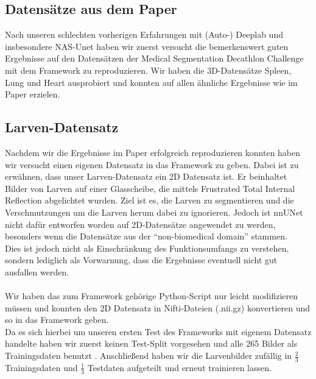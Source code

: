 
\subsection{Datensätze aus dem Paper}
Nach unseren schlechten vorherigen Erfahrungen mit (Auto-) Deeplab \cite{deeplabGithub} und insbesondere NAS-Unet \cite{nasunetGithub} haben wir zuerst versucht die bemerkenswert guten Ergebnisse \parencite[Kapitel 4, Table 2]{nnunetPaper} auf den Datensätzen der Medical Segmentation Decathlon Challenge \cite{msdChallenge} mit dem Framework zu reproduzieren. Wir haben die 3D-Datensätze Spleen, Lung und Heart \cite{msdChallenge} ausprobiert und konnten auf allen ähnliche Ergebnisse wie im Paper erzielen.\\

\subsection{Larven-Datensatz}
Nachdem wir die Ergebnisse im Paper erfolgreich reproduzieren konnten haben wir versucht einen eigenen Datensatz in das Framework zu geben. Dabei ist zu erwähnen, dass unser Larven-Datensatz ein 2D Datensatz ist. Er beinhaltet Bilder von Larven auf einer Glasscheibe, die mittels Frustrated Total Internal Reflection abgelichtet wurden. Ziel ist es, die Larven zu segmentieren und die Verschmutzungen um die Larven herum dabei zu ignorieren. Jedoch ist nnUNet nicht dafür entworfen worden auf 2D-Datensätze angewendet zu werden, besonders wenn die Datensätze aus der \enquote{non-biomedical domain} \cite{nnunetGithub2D-Daten} stammen.\\
Dies ist jedoch nicht als Einschränkung des Funktionsumfangs zu verstehen, sondern lediglich als Vorwarnung, dass die Ergebnisse eventuell nicht gut ausfallen werden.\\\\
Wir haben das zum Framework gehörige Python-Script \cite{nnunetGithub2D-Pythonscript} nur leicht modifizieren müssen und konnten den 2D Datensatz in Nifti-Dateien (.nii.gz) konvertieren und so in das Framework geben.\\
Da es sich hierbei um unseren ersten Test des Frameworks mit eigenem Datensatz handelte haben wir zuerst keinen Test-Split vorgesehen und alle 265 Bilder als Trainingsdaten benutzt .
Anschließend haben wir die Larvenbilder zufällig in $\frac{2}{3}$ Trainingsdaten und $\frac{1}{3}$ Testdaten aufgeteilt und erneut trainieren lassen. 

